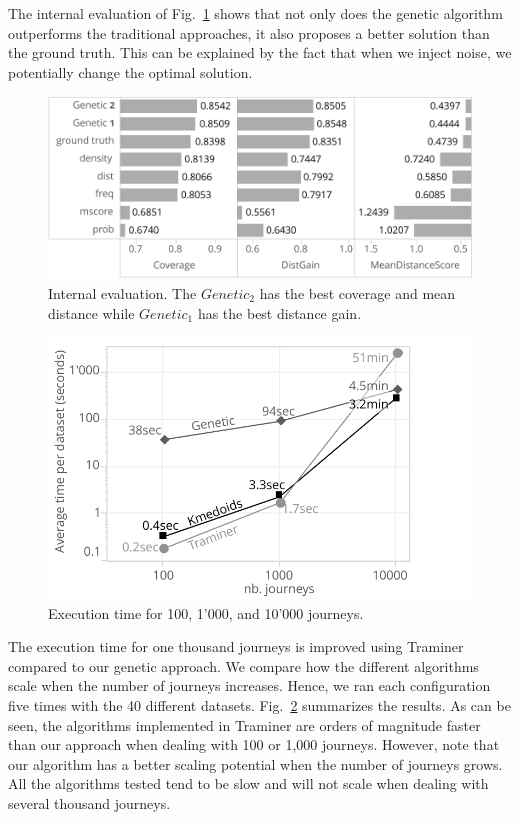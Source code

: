 \documentclass[runningheads]{llncs}
\begin{document}
{{{The internal evaluation of Fig.~\ref{fig:eval_internal} shows that not only does the genetic algorithm outperforms the traditional approaches, it also proposes a better solution than the ground truth. This can be explained by the fact that when we inject noise, we potentially change the optimal solution.  



\begin{figure}[H]
\centering
\includegraphics[width=0.9\columnwidth]{05_schema/eval_internal.pdf}
  \caption{Internal evaluation. The $Genetic_2$ has the best coverage and mean distance while $Genetic_1$ has the best distance gain.}
  \label{fig:eval_internal}
\end{figure}


\begin{figure}[H]
  \begin{center}
    
	\includegraphics[width=0.42\columnwidth]{05_schema/time.pdf}
    
  \end{center}
  \caption{Execution time for 100, 1'000, and 10'000 journeys.}
  \label{fig:performance-time}
\end{figure}

The execution time for one thousand journeys is improved using Traminer \cite{gabadinho2013searching} compared to our genetic approach. We compare how the different algorithms scale when the number of journeys increases. Hence, we ran each configuration five times with the 40 different datasets. Fig.~\ref{fig:performance-time} summarizes the results. As can be seen, the algorithms implemented in Traminer are orders of magnitude faster than our approach when dealing with 100 or 1,000 journeys. However, note that our algorithm has a better scaling potential when the number of journeys grows. All the algorithms tested tend to be slow and will not scale when dealing with several thousand journeys. 

}}}
\end{document}
